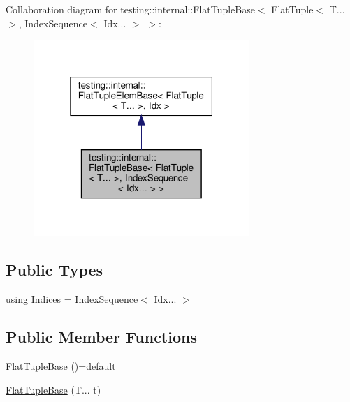 Collaboration diagram for testing\+:\+:internal\+:\+:Flat\+Tuple\+Base$<$ Flat\+Tuple$<$ T... $>$, Index\+Sequence$<$ Idx... $>$ $>$\+:\nopagebreak
\begin{figure}[H]
\begin{center}
\leavevmode
\includegraphics[width=232pt]{structtesting_1_1internal_1_1FlatTupleBase_3_01FlatTuple_3_01T_8_8_8_01_4_00_01IndexSequence_3_0db435676f5b40a729de5146d36fb9cc6}
\end{center}
\end{figure}
\subsection*{Public Types}
\begin{DoxyCompactItemize}
\item 
using \hyperlink{structtesting_1_1internal_1_1FlatTupleBase_3_01FlatTuple_3_01T_8_8_8_01_4_00_01IndexSequence_3_01Idx_8_8_8_01_4_01_4_ada1941ebde1ec1c844b72970e0ccb304}{Indices} = \hyperlink{structtesting_1_1internal_1_1IndexSequence}{Index\+Sequence}$<$ Idx... $>$
\end{DoxyCompactItemize}
\subsection*{Public Member Functions}
\begin{DoxyCompactItemize}
\item 
\hyperlink{structtesting_1_1internal_1_1FlatTupleBase_3_01FlatTuple_3_01T_8_8_8_01_4_00_01IndexSequence_3_01Idx_8_8_8_01_4_01_4_ae509b146e74176bceddc0d2f2d1cb0dc}{Flat\+Tuple\+Base} ()=default
\item 
\hyperlink{structtesting_1_1internal_1_1FlatTupleBase_3_01FlatTuple_3_01T_8_8_8_01_4_00_01IndexSequence_3_01Idx_8_8_8_01_4_01_4_ac515eec5c0647748bf8fa4ff553c706e}{Flat\+Tuple\+Base} (T... t)
\end{DoxyCompactItemize}


